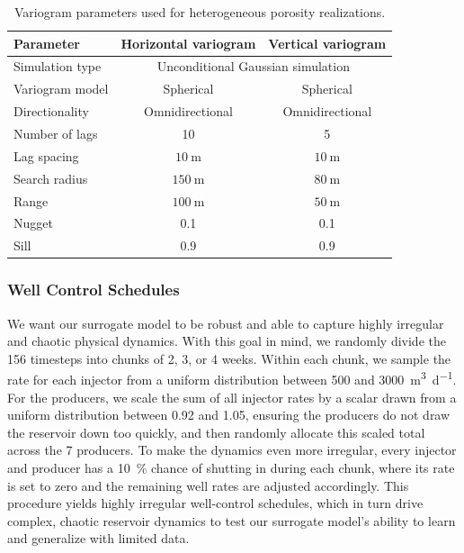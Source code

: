 \documentclass[pdflatex,sn-mathphys-ay]{sn-jnl}
\begin{document}
\begin{table}[t]
  \centering
  \caption{Variogram parameters used for heterogeneous porosity realizations.}
  \label{tab:hetero-variogram}
  \begin{tabular}{lcc}
    \toprule
    Parameter & Horizontal variogram & Vertical variogram \\
    \midrule
    Simulation type & \multicolumn{2}{c}{Unconditional Gaussian simulation} \\
    Variogram model & Spherical & Spherical \\
    Directionality & Omnidirectional & Omnidirectional \\
    Number of lags & 10 & 5 \\
    Lag spacing & \(\SI{10}{\meter}\) & \(\SI{10}{\meter}\) \\
    Search radius & \(\SI{150}{\meter}\) & \(\SI{80}{\meter}\) \\
    Range & \(\SI{100}{\meter}\) & \(\SI{50}{\meter}\) \\
    Nugget & 0.1 & 0.1 \\
    Sill & 0.9 & 0.9 \\
    \bottomrule
  \end{tabular}
\end{table}

\subsubsection{Well Control Schedules}
\label{sec:schedules}

We want our surrogate model to be robust and able to capture highly irregular and
chaotic physical dynamics. With this goal in mind, we randomly divide the 156
timesteps into chunks of 2, 3, or 4 weeks. Within each chunk, we sample the rate
for each injector from a uniform distribution between \SI{500}{} and
\SI{3000}{\cubic\meter\per\day}. For the producers, we scale the sum of all
injector rates by a scalar drawn from a uniform distribution between 0.92 and
1.05, ensuring the producers do not draw the reservoir down too quickly, and then
randomly allocate this scaled total across the 7 producers. To make the dynamics
even more irregular, every injector and producer has a \SI{10}{\percent} chance of
shutting in during each chunk, where its rate is set to zero and the remaining
well rates are adjusted accordingly. This procedure yields highly irregular
well-control schedules, which in turn drive complex, chaotic reservoir dynamics to
test our surrogate model's ability to learn and generalize with limited data.
\end{document}
